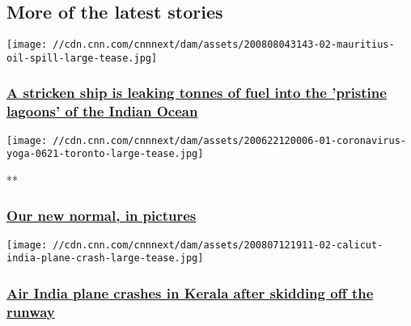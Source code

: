 \hypertarget{more-of-the-latest-stories-}{%
\subsection{More of the latest
stories~}\label{more-of-the-latest-stories-}}

\href{/2020/08/08/world/mauritius-oil-spill-scli-intl/index.html}{}

\texttt{[image: //cdn.cnn.com/cnnnext/dam/assets/200808043143-02-mauritius-oil-spill-large-tease.jpg]}

\hypertarget{a-stricken-ship-is-leaking-tonnes-of-fuel-into-the-pristine-lagoons-of-the-indian-ocean}{%
\subsubsection{\texorpdfstring{\href{/2020/08/08/world/mauritius-oil-spill-scli-intl/index.html}{A
stricken ship is leaking tonnes of fuel into the 'pristine lagoons' of
the Indian
Ocean}}{A stricken ship is leaking tonnes of fuel into the 'pristine lagoons' of the Indian Ocean}}\label{a-stricken-ship-is-leaking-tonnes-of-fuel-into-the-pristine-lagoons-of-the-indian-ocean}}

\href{/2020/05/20/world/gallery/new-normal-coronavirus/index.html}{}

\texttt{[image: //cdn.cnn.com/cnnnext/dam/assets/200622120006-01-coronavirus-yoga-0621-toronto-large-tease.jpg]}

**

\hypertarget{our-new-normal-in-pictures}{%
\subsubsection{\texorpdfstring{\href{/2020/05/20/world/gallery/new-normal-coronavirus/index.html}{Our
new normal, in
pictures}}{Our new normal, in pictures}}\label{our-new-normal-in-pictures}}

\href{/2020/08/07/asia/plane-crash-calicut-india-intl/index.html}{}

\texttt{[image: //cdn.cnn.com/cnnnext/dam/assets/200807121911-02-calicut-india-plane-crash-large-tease.jpg]}

\hypertarget{air-india-plane-crashes-in-kerala-after-skidding-off-the-runway-1}{%
\subsubsection{\texorpdfstring{\href{/2020/08/07/asia/plane-crash-calicut-india-intl/index.html}{Air
India plane crashes in Kerala after skidding off the
runway}}{Air India plane crashes in Kerala after skidding off the runway}}\label{air-india-plane-crashes-in-kerala-after-skidding-off-the-runway-1}}

